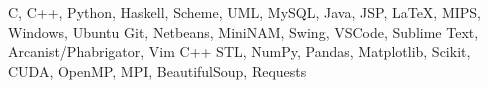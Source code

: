 \documentclass[10pt]{article}
\begin{document}
\vspace{-0.5ex}
{\color{headliner} \spacedhrule{0.15ex}{1.0ex}}
\begingroup
    \fontsize{10pt}{12pt}\selectfont
    \vspace{-0.7ex}
	{C,\hspace{0.75ex} 
	C++,\hspace{0.75ex}  Python,\hspace{0.75ex}
	Haskell,\hspace{0.75ex}
	Scheme,\hspace{0.75ex}
	UML,\hspace{0.75ex} 
	MySQL,\hspace{0.75ex} Java,\hspace{0.75ex} 
	JSP,\hspace{0.75ex} 
	LaTeX,\hspace{0.75ex} MIPS,\hspace{0.75ex} Windows,\hspace{0.75ex} Ubuntu}
	\vspace{-0.7ex}
	{Git,\hspace{0.75ex} Netbeans,\hspace{0.75ex} MiniNAM,\hspace{0.75ex} Swing,\hspace{0.75ex} VSCode,\hspace{0.75ex} Sublime Text,\hspace{0.75ex} Arcanist/Phabrigator,\hspace{0.75ex} Vim}
	\vspace{-0.7ex}
    {C++ STL,\hspace{0.75ex} NumPy,\hspace{0.75ex} Pandas,\hspace{0.75ex} Matplotlib,\hspace{0.75ex} Scikit,\hspace{0.75ex} CUDA,\hspace{0.75ex}
    OpenMP,\hspace{0.75ex}
    MPI,\hspace{0.75ex}
    BeautifulSoup,\hspace{0.75ex} Requests }
\endgroup
\end{document}

